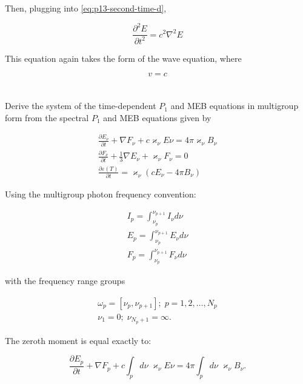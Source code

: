 \documentclass{template}
\begin{document}
Then, plugging into \autoref{eq:p13-second-time-d}, 

\begin{equation}
    \frac{\partial^2 E}{\partial t^2} = c^2\nabla^2 E
\end{equation}

This equation again takes the form of the wave equation, where

\begin{equation}
    \boxed{v = c}
\end{equation}




\section{} Derive the system of the time-dependent $P_1$ and MEB equations in multigroup form from the spectral $P_1$ and MEB equations given by

\begin{gather*}
    \frac{\partial E_\nu}{\partial t} + \nabla F_\nu + c\varkappa_\nu E\nu = 4\pi \varkappa_\nu B_\nu\\
    \frac{\partial F_\nu}{\partial t} + \frac{1}{3}\nabla E_\nu + \varkappa_\nu F_\nu = 0\\
    \frac{\partial \varepsilon(T)}{\partial t} = \varkappa_\nu (cE_\nu - 4\pi B_\nu)
\end{gather*}

Using the multigroup photon frequency convention:

\begin{gather*}
    I_p = \int_{\nu_p}^{\nu_{p+1}}I_\nu d\nu\\
    E_p = \int_{\nu_p}^{\nu_{p+1}}E_\nu d\nu\\
    F_p = \int_{\nu_p}^{\nu_{p+1}}F_\nu d\nu
\end{gather*}

with the frequency range groups 

\begin{gather*}
    \omega_p = [\nu_p, \nu_{p+1}]; \; p=1,2,\dots,N_p\\
    \nu_1 = 0; \; \nu_{N_p + 1} = \infty.
\end{gather*}

The zeroth moment is equal exactly to:

\begin{equation}
    \frac{\partial E_p}{\partial t} + \nabla F_p + c \int_p d\nu \; \varkappa_\nu E\nu = 4\pi \int_p d\nu \;\varkappa_\nu B_\nu.
\end{equation}
\end{document}
